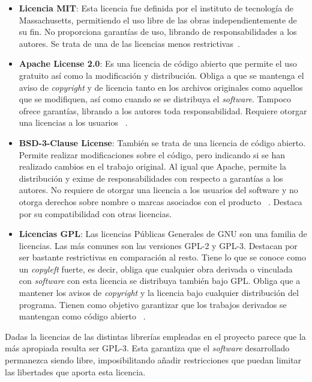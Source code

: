 \begin{itemize}
	\item \textbf{Licencia MIT}: Esta licencia fue definida por el instituto de tecnología de Massachusetts, permitiendo el uso libre de las obras independientemente de su fin. No proporciona garantías de uso, librando de responsabilidades a los autores. Se trata de una de las licencias menos restrictivas~\cite{MIT}.
	
	\item \textbf{Apache License 2.0}: Es una licencia de código abierto que permite el uso gratuito así como la modificación y distribución. Obliga a que se mantenga el aviso de \textit{copyright} y de licencia tanto en los archivos originales como aquellos que se modifiquen, así como cuando se se distribuya el \textit{software}. Tampoco ofrece garantías, librando a los autores toda responsabilidad. Requiere otorgar una licencias a los usuarios ~\cite{apache}.
	
	\item \textbf{BSD-3-Clause License}: También se trata de una licencia de código abierto. Permite realizar modificaciones sobre el código, pero indicando si se han realizado cambios en el trabajo original. Al igual que Apache, permite la distribución y exime de responsabilidades con respecto a garantías a los autores. No requiere de otorgar una licencia a los usuarios del software y no otorga derechos sobre nombre o marcas asociados con el producto ~\cite{BSD}. Destaca por su compatibilidad con otras licencias.
	
	\item \textbf{Licencias GPL}: Las licencias Públicas Generales de GNU son una familia de licencias. Las más comunes son las versiones GPL-2 y GPL-3. Destacan por ser bastante restrictivas en comparación al resto. Tiene lo que se conoce como un \textit{copyleft} fuerte, es decir, obliga que cualquier obra derivada o vinculada con \textit{software} con esta licencia se distribuya también bajo GPL. Obliga que a mantener los avisos de \textit{copyright} y la licencia bajo cualquier distribución del programa. Tienen como objetivo garantizar que los trabajos derivados se mantengan como código abierto ~\cite{GPL}.
	
\end{itemize}

Dadas la licencias de las distintas librerías empleadas en el proyecto parece que la más apropiada resulta ser GPL-3. Esta garantiza que el \textit{software} desarrollado permanezca siendo libre, imposibilitando añadir restricciones que puedan limitar las libertades que aporta esta licencia.

